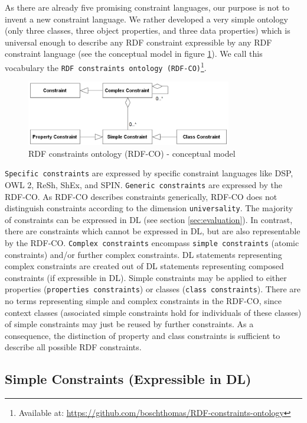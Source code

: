\documentclass{llncs}
\newcommand{\ms}[1]{\texttt{#1}}
\begin{document}
As there are already five promising constraint languages, our purpose is not to invent a new constraint language.
We rather developed a very simple ontology (only three classes, three object properties, and three data properties) which is universal enough to describe any RDF constraint expressible by any RDF constraint language (see the conceptual model in figure \ref{fig:RDF-CO-conceptual-model}).
We call this vocabulary the \ms{RDF constraints ontology (RDF-CO)}\footnote{Available at: \url{https://github.com/boschthomas/RDF-constraints-ontology}}.

\begin{figure}
	\centering
		\includegraphics[width=0.80\textwidth]{images/RDF-CO-conceptual-model.png}
	\caption{RDF constraints ontology (RDF-CO) - conceptual model}
	\label{fig:RDF-CO-conceptual-model}
\end{figure}

\ms{Specific constraints} are expressed by specific constraint languages like DSP, OWL 2, ReSh, ShEx, and SPIN.
\ms{Generic constraints} are expressed by the RDF-CO.
As RDF-CO describes constraints generically, RDF-CO does not distinguish constraints according to the dimension \ms{universality}. 
The majority of constraints can be expressed in DL (see section \ref{sec:evaluation}).
In contrast, there are constraints which cannot be expressed in DL, but are also representable by the RDF-CO. 
\ms{Complex constraints} encompass \ms{simple constraints} (atomic constraints) and/or further complex constraints.
DL statements representing complex constraints are created out of DL statements representing composed constraints (if expressible in DL). 
Simple constraints may be applied to either properties (\ms{properties constraints}) or classes (\ms{class constraints}).
There are no terms representing simple and complex constraints in the RDF-CO, since context classes (associated simple constraints hold for individuals of these classes) of simple constraints may just be reused by further constraints.
As a consequence, the distinction of property and class constraints is sufficient to describe all possible RDF constraints.

\subsection{Simple Constraints (Expressible in DL)}
\end{document}
